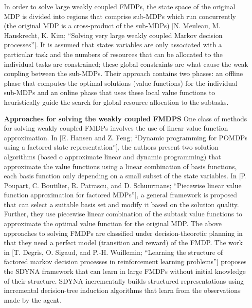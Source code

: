 \documentclass[11pt]{article}
\begin{document}
In order to solve large weakly coupled FMDPs, the state space of the original MDP is divided into regions that comprise sub-MDPs which run concurrently (the original MDP is a cross-product of the sub-MDPs) [N. Meuleau, M. Hauskrecht, K. Kim; “Solving very large weakly coupled Markov decision processes”]. It is assumed that states variables are only associated with a particular task and the numbers of resources that can be allocated to the individual tasks are constrained; these global constraints are what cause the weak coupling between the sub-MDPs. Their approach contains two phases: an offline phase that computes the optimal solutions (value functions) for the individual sub-MDPs and an online phase that uses these local value functions to heuristically guide the search for global resource allocation to the subtasks.


\textbf{Approaches for solving the weakly coupled FMDPS}
%
One class of methods for solving weakly coupled FMDPs involves the use of linear value function approximation. In [E. Hansen and Z. Feng; “Dynamic programming for POMDPs using a factored state representation”], the authors present two solution algorithms (based o approximate linear and dynamic programming) that approximate the value functions using a linear combination of basis functions, each basis function only depending on a small subset of the state variables. In [P. Poupart, C. Boutilier, R. Patrascu, and D. Schuurmans; “Piecewise linear value function approximation for factored MDPs”], a general framework is proposed that can select a suitable basis set and modify it based on the solution quality. Further, they use piecewise linear combination of the subtask value functions to approximate the optimal value function for the original MDP. The above approaches to solving FMDPs are classified under decision-theoretic planning in that they need a perfect model (transition and reward) of the FMDP. The work in [T. Degris, O. Sigaud, and P.-H. Wuillemin; “Learning the structure of factored markov decision processes in reinforcement learning problems”] proposes the SDYNA framework that can learn in large FMDPs without initial knowledge of their structure. SDYNA incrementally builds structured representations using incremental decision-tree induction algorithms that learn from the observations made by the agent.
\end{document}
